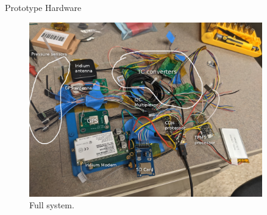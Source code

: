 \documentclass[UKenglish]{beamer}
\begin{document}
\begin{frame}[allowframebreaks]{Prototype Hardware}
	\begin{figure}[h!]
		\centering
		\includegraphics[width=0.9\textwidth]{images/subsystem-hardware-annotated.png}
		\caption{Full system.}
	\end{figure}

	
\end{frame}
\end{document}
